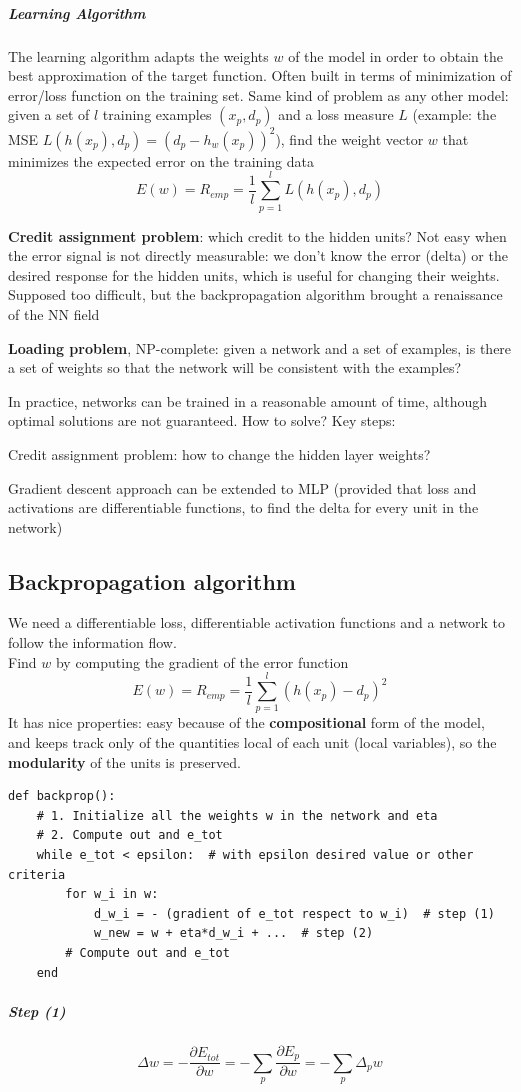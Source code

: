 \documentclass[10pt]{report}
\begin{document}
\subparagraph{Learning Algorithm} The learning algorithm adapts the weights $w$ of the model in order to obtain the best approximation of the target function. Often built in terms of minimization of error/loss function on the training set. Same kind of problem as any other model: given a set of $l$ training examples $(x_p, d_p)$ and a loss measure $L$ (example: the MSE $L(h(x_p), d_p) = (d_p - h_w(x_p))^2$), find the weight vector $w$ that minimizes the expected error on the training data $$E(w) = R_{emp} = \frac{1}{l}\sum_{p=1}^l L(h(x_p), d_p)$$
\begin{list}{}{}
	\item \textbf{Credit assignment problem}: which credit to the hidden units? Not easy when the error signal is not directly measurable: we don't know the error (delta) or the desired response for the hidden units, which is useful for changing their weights. Supposed too difficult, but the backpropagation algorithm brought a renaissance of the NN field
	\item \textbf{Loading problem}, NP-complete: given a network and a set of examples, is there a set of weights so that the network will be consistent with the examples?
\end{list}
In practice, networks can be trained in a reasonable amount of time, although optimal solutions are not guaranteed. How to solve? Key steps:
\begin{list}{}{}
	\item Credit assignment problem: how to change the hidden layer weights?
	\item Gradient descent approach can be extended to MLP (provided that loss and activations are differentiable functions, to find the delta for every unit in the network)
\end{list}
\subsection{Backpropagation algorithm} We need a differentiable loss, differentiable activation functions and a network to follow the information flow.\\
Find $w$ by computing the gradient of the error function $$E(w) = R_{emp} = \frac{1}{l}\sum_{p=1}^l (h(x_p) - d_p)^2$$
It has nice properties: easy because of the \textbf{compositional} form of the model, and keeps track only of the quantities local of each unit (local variables), so the \textbf{modularity} of the units is preserved.
\begin{lstlisting}[style=myPython]
def backprop():
	# 1. Initialize all the weights w in the network and eta
	# 2. Compute out and e_tot
	while e_tot < epsilon:  # with epsilon desired value or other criteria
		for w_i in w:
			d_w_i = - (gradient of e_tot respect to w_i)  # step (1)
			w_new = w + eta*d_w_i + ...  # step (2)
		# Compute out and e_tot
	end
\end{lstlisting}
\subparagraph{Step (1)} $$\Delta w = - \frac{\partial E_{tot}}{\partial w} = - \sum_p \frac{\partial E_p}{\partial w} = -\sum_p \Delta_p w$$
\end{document}
